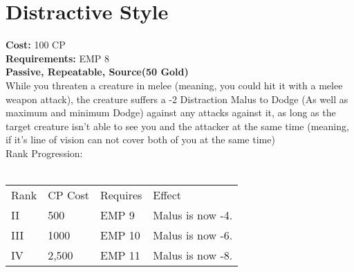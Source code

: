 \section{Distractive Style}\label{perk:distractiveStyle}
\textbf{Cost:} 100 CP\\
\textbf{Requirements:} EMP 8\\
\textbf{Passive, Repeatable, Source(50 Gold)}\\
While you threaten a creature in melee (meaning, you could hit it with a melee weapon attack), the creature suffers a -2 Distraction Malus to Dodge (As well as maximum and minimum Dodge) against any attacks against it, as long as the target creature isn't able to see you and the attacker at the same time (meaning, if it's line of vision can not cover both of you at the same time)\\
Rank Progression:\\
\\
\begin{tabular}{l | l | l | l}
    Rank & CP Cost & Requires & Effect\\
    II & 500 & EMP 9 & Malus is now -4.\\
    III & 1000 & EMP 10 &  Malus is now -6.\\
    IV & 2,500 & EMP 11 &  Malus is now -8.\\
\end{tabular}